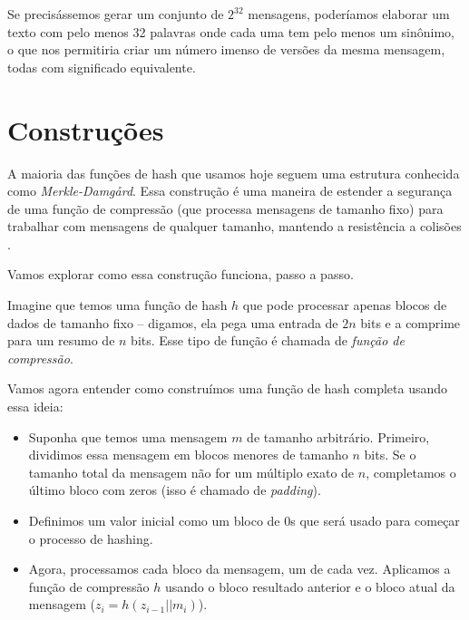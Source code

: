Se precisássemos gerar um conjunto de $2^{32}$ mensagens, poderíamos elaborar um texto com pelo menos 32 palavras onde cada uma tem pelo menos um sinônimo, o que nos permitiria criar um número imenso de versões da mesma mensagem, todas com significado equivalente.

\section{Construções}
\label{sec:construcoes}

A maioria das funções de hash que usamos hoje seguem uma estrutura conhecida como {\em Merkle-Damg\aa rd}.
  Essa construção é uma maneira de estender a segurança de uma função de compressão (que processa mensagens de tamanho fixo) para trabalhar com mensagens de qualquer tamanho, mantendo a resistência a colisões \cite{Merkle89,Damgard89}.

Vamos explorar como essa construção funciona, passo a passo.

Imagine que temos uma função de hash $h$ que pode processar apenas blocos de dados de tamanho fixo -- digamos, ela pega uma entrada de $2n$ bits e a comprime para um resumo de $n$ bits.
Esse tipo de função é chamada de {\em função de compressão}.

Vamos agora entender como construímos uma função de hash completa usando essa ideia:

\begin{itemize}
\item Suponha que temos uma mensagem $m$ de tamanho arbitrário.
  Primeiro, dividimos essa mensagem em blocos menores de tamanho $n$ bits.
  Se o tamanho total da mensagem não for um múltiplo exato de $n$, completamos o último bloco com zeros (isso é chamado de {\em padding}).
\item Definimos um valor inicial como um bloco de 0s que será usado para começar o processo de hashing. 
\item Agora, processamos cada bloco da mensagem, um de cada vez.
  Aplicamos a função de compressão $h$ usando o bloco resultado anterior e o bloco atual da mensagem ($z_i = h(z_{i-1}||m_i)$).
\end{itemize}

\begin{center}
\end{center}



